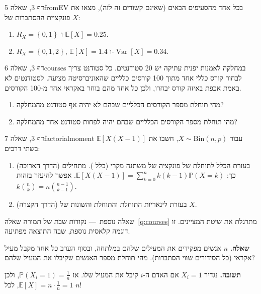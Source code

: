 \documentclass[11pt,a4paper]{report}
\newcommand{\set}[1]{\left\{#1\right\}}
\newcommand{\PP}{\mathbb{P}}
\newcommand{\E}{\mathbb{E}}
\DeclareMathOperator{\Var}{Var}
\newcommand{\Bin}{\mathrm{Bin}}
\newcommand{\dash}{{\rmfamily —}}
\begin{document}
\begin{exercise}{דף 3, שאלה 5}{fromEV}
בכל אחד מהסעיפים הבאים (שאינם קשורים זה לזה), מצאו את פונקציית ההסתברות של $X$:
\begin{enumerate}[label=(\alph*)]
  \item $R_X=\set{0,1}$ ו-$\E[X]=0.25$.
  \item $R_X=\set{0,1,2}$, $\E[X]=1.4$ ו-$\Var[X]=0.34$.
\end{enumerate}
\end{exercise}

\begin{exercise}{דף 3, שאלה 6}{courses}
במחלקה לאמנות יפנית עתיקה יש 20 סטודנטים. כל סטודנט צריך לבחור קורס כללי אחד מתוך 100 קורסים כלליים שהאוניברסיטה מציעה. לסטודנטים לא באמת אכפת באיזה קורס יבחרו, ולכן כל אחד מהם בוחר באקראי אחד מ-100 הקורסים.
\begin{enumerate}[label=(\alph*)]
  \item מהי תוחלת מספר הקורסים הכלליים שבהם לא יהיה אף סטודנט מהמחלקה?
  \item מהי תוחלת מספר הקורסים הכלליים שבהם יהיה לפחות סטודנט אחד מהמחלקה?
\end{enumerate}
\end{exercise}

\begin{exercise}{דף 3, שאלה 7}{factorialmoment}
עבור $X\sim\Bin(n,p)$, חשבו את $\E[X(X-1)]$ בשתי דרכים:
\begin{enumerate}[label=(\alph*)]
  \item (הדרך הארוכה) בעזרת הכלל לתוחלת של פונקציה של משתנה מקרי (כלל ). מתחילים כך:
  $\E[X(X-1)]=\sum_{k=0}^nk(k-1)\PP(X=k)$. אפשר להיעזר בזהות $k\binom nk=n\binom{n-1}{k-1}$.
  \item (הדרך הקצרה) בעזרת לינאריות התוחלת והתוחלת והשונות של $X$.
\end{enumerate}
\end{exercise}

\begin{suggestion}{שאלה נוספת~\dash{} נקודות שבת של תמורה}
שאלה~\ref{q:courses} מתרגלת את שיטת המציינים. זו דוגמה קלאסית נוספת, שבה התוצאה מפתיעה.

\textbf{שאלה.} $n$ אנשים מפקידים את המעילים שלהם במלתחה, ובסוף הערב כל אחד מקבל מעיל אקראי (כל הסידורים שווי הסתברות). מהי תוחלת מספר האנשים שקיבלו את המעיל שלהם?

\textbf{תשובה.} נגדיר $X_i=1$ אם האדם ה-$i$ קיבל את המעיל שלו. אז $\PP(X_i=1)=\frac1n$, ולכן $\E[X]=n\cdot\frac1n=1$, לכל $n$!
\end{suggestion}
\end{document}
